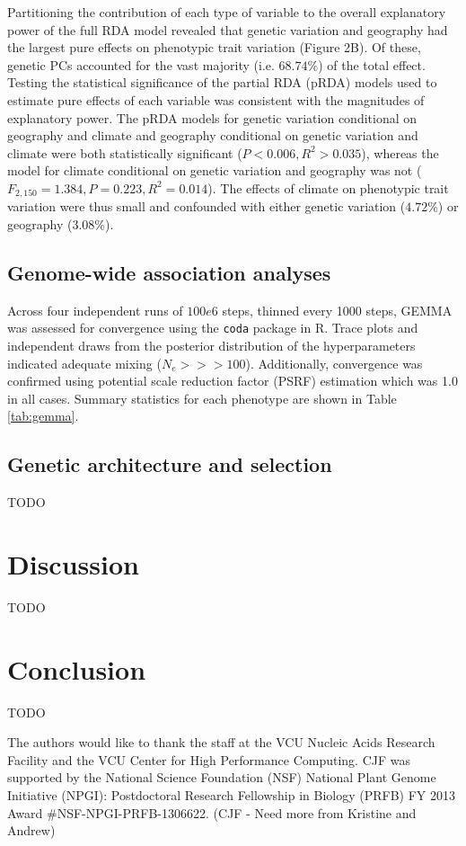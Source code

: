 \documentclass[smallextended]{svjour3}
\begin{document}
Partitioning the contribution of each type of variable to the overall
explanatory power of the full RDA model revealed that
genetic variation and geography had the largest pure effects on phenotypic
trait
variation (Figure 2B). Of these, genetic PCs accounted for the vast majority
(i.e. $68.74\%$) of the total effect. Testing the statistical significance of
the partial RDA (pRDA) models used to estimate pure effects of each variable
was
consistent with the magnitudes of explanatory power. The pRDA models for
genetic
variation conditional on geography and climate and geography conditional on
genetic variation and climate were both statistically significant ($P < 0.006,
R^2 > 0.035$), whereas the model for climate conditional on genetic variation
and geography was not ($F_{2,150} = 1.384, P = 0.223, R^2 = 0.014$). The
effects
of climate on phenotypic trait variation were thus small and confounded with
either genetic variation ($4.72\%$) or geography ($3.08\%$).


\subsection*{Genome-wide association analyses}
Across four independent runs of $100e6$ steps, thinned every 1000 steps, GEMMA
was assessed 
for convergence using the \texttt{coda} \citep[][version 0.18.1]{coda} package
in R. Trace plots and independent 
draws from the posterior distribution of the hyperparameters indicated adequate
mixing 
($N_e >>> 100$). Additionally, convergence was confirmed using potential scale
reduction factor 
(PSRF) estimation which was 1.0 in all cases.  Summary statistics for each
phenotype are shown 
in Table \ref{tab:gemma}.

\subsection*{Genetic architecture and selection}
TODO

\section*{Discussion}
TODO


\section*{Conclusion}
TODO


\begin{acknowledgements} The authors would like to thank the staff at
the VCU Nucleic Acids Research Facility and the
VCU Center for High Performance Computing.  CJF was supported by the National
Science Foundation (NSF) National Plant Genome Initiative (NPGI): Postdoctoral
Research Fellowship in Biology (PRFB) FY 2013 Award \#NSF-NPGI-PRFB-1306622.
(CJF - Need more from Kristine and Andrew)
\end{acknowledgements}
\end{document}

